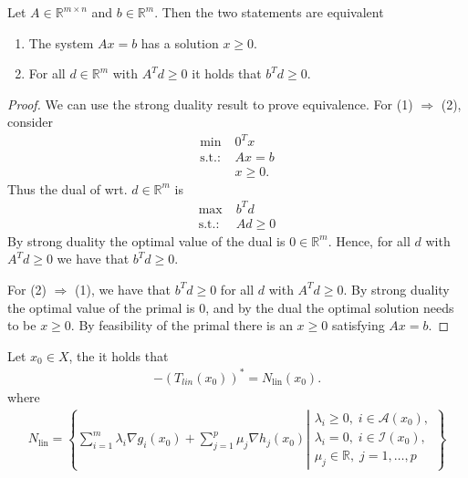 \begin{lemma}
    \label{lem: ferkas}
    Let $A \in \mathbb{R}^{m \times n}$ and $b \in \mathbb{R}^{m}$. Then
    the two statements are equivalent
    \begin{enumerate}
        \item The system $Ax = b$ has a solution $x\ge0$.
        \item For all $d \in \mathbb{R}^{m}$ with $A^{T} d \ge 0$ it holds
            that $b^{T} d  \ge 0$.
    \end{enumerate}
\end{lemma}
\begin{proof}
    We can use the strong duality result to prove equivalence.
    For (1) $\Rightarrow$ (2), consider
    \begin{align}
        \text{min}\; & 0^{T} x\\
        \text{s.t.:}\;& Ax = b \nonumber \\
            & x \ge 0. \nonumber
    \end{align}
    Thus the dual of wrt. $d \in \mathbb{R}^{m}$ is
    \begin{align}
        \text{max}\; & b^{T}d \\
        \text{s.t.:}\;& Ad \ge 0 \nonumber
    \end{align}
    By strong duality the optimal value of the dual is $0 \in
    \mathbb{R}^{m}$. Hence, for all $d$ with $A^{T}d \ge 0$ we have that
    $b^{T}d \ge 0$.

    For (2) $\Rightarrow$ (1), we have that $b^{T} d \ge 0$ for all $d$ with
    $A^{T} d \ge 0$. By strong duality the optimal value of the primal is
    $0$, and by the dual the optimal solution needs to be $x\ge 0$. By
    feasibility of the primal there is an $x\ge0$ satisfying $Ax=b$.
\end{proof}
\begin{theorem}
    \label{thm: duality}
    Let $x_0 \in X$, the it holds that
    \begin{align}
        -(T_{lin}(x_0))^{*} = N_{\text{lin} }(x_0).
    \end{align}
    where
    \begin{align}
        N_{\text{lin}} =
        \left\{
            \sum_{i=1}^{m} \lambda_i \nabla g_i(x_0)
            + \sum_{j=1}^{p} \mu_j\nabla h_j(x_0)
             \left|
             \begin{array}{l}
                \lambda_i \ge 0,\; i \in \mathcal{A}(x_0),\\
                \lambda_i = 0,\; i \in \mathcal{I}(x_0),\\
                \mu_j \in \mathbb{R},\; j=1,\ldots,p
            \end{array}
        \right\} \right.
    \end{align}
\end{theorem}
